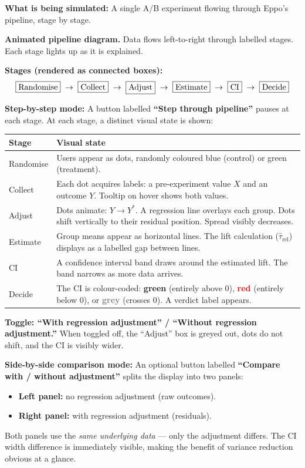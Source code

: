 \documentclass[12pt, a4paper]{article}
\begin{document}
\begin{simulation}
\textbf{What is being simulated:}
A single A/B experiment flowing through Eppo's pipeline, stage by stage.

\textbf{Animated pipeline diagram.}  Data flows left-to-right through
labelled stages.  Each stage lights up as it is explained.

\textbf{Stages (rendered as connected boxes):}
\[
  \fbox{Randomise}
  \;\to\;
  \fbox{Collect}
  \;\to\;
  \fbox{Adjust}
  \;\to\;
  \fbox{Estimate}
  \;\to\;
  \fbox{CI}
  \;\to\;
  \fbox{Decide}
\]

\textbf{Step-by-step mode:}
A button labelled \textbf{``Step through pipeline''} pauses at each stage.
At each stage, a distinct visual state is shown:

\begin{center}
\renewcommand{\arraystretch}{1.3}
\begin{tabular}{@{} l p{9cm} @{}}
\toprule
\textbf{Stage} & \textbf{Visual state} \\
\midrule
Randomise & Users appear as dots, randomly coloured blue (control) or
  green (treatment). \\
Collect & Each dot acquires labels: a pre-experiment value $X$ and an
  outcome $Y$.  Tooltip on hover shows both values. \\
Adjust & Dots animate: $Y \to Y^*$.  A regression line overlays each group.
  Dots shift vertically to their residual position.  Spread visibly
  decreases. \\
Estimate & Group means appear as horizontal lines.  The lift calculation
  ($\hat{\tau}_{\text{rel}}$) displays as a labelled gap between lines. \\
CI & A confidence interval band draws around the estimated lift.
  The band narrows as more data arrives. \\
Decide & The CI is colour-coded:
  \textcolor{green!60!black}{\textbf{green}} (entirely above 0),
  \textcolor{red}{\textbf{red}} (entirely below 0), or
  \textcolor{gray}{\textbf{grey}} (crosses 0).  A verdict label appears. \\
\bottomrule
\end{tabular}
\end{center}

\textbf{Toggle: ``With regression adjustment'' / ``Without regression
adjustment.''}
When toggled off, the ``Adjust'' box is greyed out, dots do not shift,
and the CI is visibly wider.

\textbf{Side-by-side comparison mode:}
An optional button labelled \textbf{``Compare with / without adjustment''}
splits the display into two panels:
\begin{itemize}[nosep]
  \item \textbf{Left panel:} no regression adjustment (raw outcomes).
  \item \textbf{Right panel:} with regression adjustment (residuals).
\end{itemize}
Both panels use the \emph{same underlying data} --- only the adjustment
differs.  The CI width difference is immediately visible, making the
benefit of variance reduction obvious at a glance.


\end{simulation}
\end{document}
